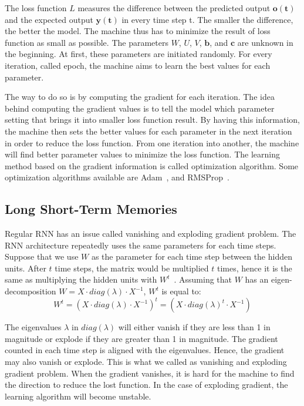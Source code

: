 The loss function $L$ measures the difference between the predicted output $\mathbf{o(t)}$ and the expected output $\mathbf{y(t)}$ in every time step t. The smaller the difference, the better the model. The machine thus has to minimize the result of loss function as small as possible. The parameters $W$, $U$, $V$, $\mathbf{b}$, and $\mathbf{c}$ are unknown in the beginning. At first, these parameters are initiated randomly. For every iteration, called epoch, the machine aims to learn the best values for each parameter.

The way to do so is by computing the gradient for each iteration. The idea behind computing the gradient values is to tell the model which parameter setting that brings it into smaller loss function result. By having this information, the machine then sets the better values for each parameter in the next iteration in order to reduce the loss function. From one iteration into another, the machine will find better parameter values to minimize the loss function. The learning method based on the gradient information is called optimization algorithm. Some optimization algorithms available are Adam~\citep{kingma2014adam}, and RMSProp~\citep{tieleman2012lecture}.

\subsection{Long Short-Term Memories}
Regular RNN has an issue called vanishing and exploding gradient problem. The RNN architecture repeatedly uses the same parameters for each time steps. Suppose that we use $W$ as the parameter for each time step between the hidden units. After $t$ time steps, the matrix would be multiplied $t$ times, hence it is the same as multiplying the hidden units with $W^{t}$~\citep{Goodfellow-et-al-2016-Book}. Assuming that $W$ has an eigen-decomposition $W = X \cdot diag(\lambda) \cdot X^{-1}$, $W^{t}$ is equal to:
\begin{equation}
W^{t} = (X \cdot diag(\lambda) \cdot X^{-1})^{t} = (X \cdot diag(\lambda)^{t} \cdot X^{-1})
\end{equation}

The eigenvalues $\lambda$ in $diag(\lambda)$ will either vanish if they are less than 1 in magnitude or explode if they are greater than 1 in magnitude. The gradient counted in each time step is aligned with the eigenvalues. Hence, the gradient may also vanish or explode. This is what we called as vanishing and exploding gradient problem. When the gradient vanishes, it is hard for the machine to find the direction to reduce the lost function. In the case of exploding gradient, the learning algorithm will become unstable.

